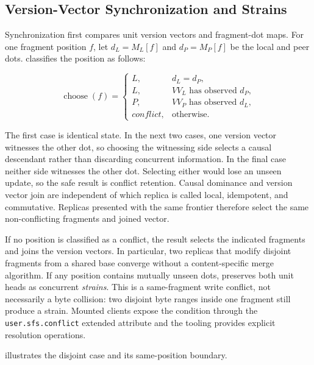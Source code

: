 \subsection{Version-Vector Synchronization and Strains}
\label{subsec:sync}

Synchronization first compares unit version vectors and fragment-dot maps.  For
one fragment position $f$, let $d_L=M_L[f]$ and $d_P=M_P[f]$ be the local and
peer dots.  \sfs{} classifies the position as follows:

\begin{equation}
\operatorname{choose}(f)=
\begin{cases}
L, & d_L=d_P,\\
L, & VV_L\text{ has observed }d_P,\\
P, & VV_P\text{ has observed }d_L,\\
\mathit{conflict}, & \text{otherwise.}
\end{cases}
\end{equation}

The first case is identical state.  In the next two cases, one version vector
witnesses the other dot, so choosing the witnessing side selects a causal
descendant rather than discarding concurrent information.  In the final case
neither side witnesses the other dot.  Selecting either would lose an unseen
update, so the safe result is conflict retention.  Causal dominance and version
vector join are independent of which replica is called local, idempotent, and
commutative.  Replicas presented with the same frontier therefore select the
same non-conflicting fragments and joined vector.

If no position is classified as a conflict, the result selects the indicated
fragments and joins the version vectors.  In particular, two replicas that
modify disjoint fragments from a shared base converge without a
content-specific merge algorithm.  If any position contains mutually unseen
dots, \sfs{} preserves both unit heads as concurrent \emph{strains}.  This is a
same-fragment write conflict, not necessarily a byte collision: two disjoint
byte ranges inside one fragment still produce a strain.  Mounted clients expose
the condition through the \texttt{user.sfs.conflict} extended attribute and the
tooling provides explicit resolution operations.

 illustrates the disjoint case and its same-position
boundary.

